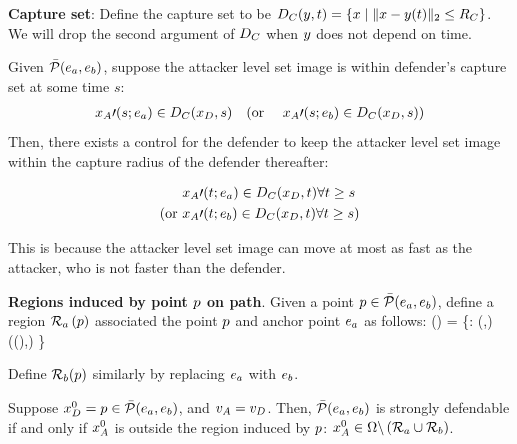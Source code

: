 \begin{defn} %
\textbf{Capture set}: Define the capture set to be $D_C(y,t)=\{x \mid \|x-y(t)\|_2\leq R_C\}$. We will drop the second argument of $D_C$ when $y$ does not depend on time.
\end{defn}

\begin{rem}
Given $\bar{\mathcal{P}}(e_a,e_b)$, suppose the attacker level set image is within defender's capture set at some time $s$: 
\begin{equation*}
\begin{aligned}
&x_A\prime(s;e_a) \in D_C(x_D, s) \quad \text{(or } & x_A\prime(s;e_b) \in D_C(x_D, s) \text{)}
\end{aligned}
\end{equation*}
Then, there exists a control for the defender to keep the attacker level set image within the capture radius of the defender thereafter: 

\begin{equation*}
\begin{aligned}
&x_A\prime(t;e_a) \in D_C(x_D, t) \forall t\geq s \\
\text{(or } & x_A\prime(t;e_b) \in D_C(x_D, t) \forall t\geq s\text{)}
\end{aligned}
\end{equation*}

This is because the attacker level set image can move at most as fast as the attacker, who is not faster than the defender.
\end{rem}

\begin{defn} %
\label{def:d_win_region}
\textbf{Regions induced by point $p$ on path}. Given a point $p\in\bar{\mathcal{P}}(e_a,e_b)$, define a region $\mathcal{R}_a\left(p\right)$ associated the point $p$ and anchor point $e_a$ as follows:
\bq
\rpa\left(\ppath\right) = \left\{\x: \dist(\x,\apa) \leq \dist(\Dc(\ppath),\apa) \right\}
\eq

Define $\mathcal{R}_b(p)$ similarly by replacing $e_a$ with $e_b$.
\end{defn}

\begin{lem}
\label{lem:d_winning_region}
Suppose $x_D^0 = p \in \bar{\mathcal{P}}(e_a,e_b)$, and $v_A=v_D$. Then, $\bar{\mathcal{P}}(e_a,e_b)$ is strongly defendable if and only if $x_A^0$ is outside the region induced by $p$: $x_A^0\in\Omega\backslash\left(\mathcal{R}_a \cup \mathcal{R}_b\right)$.
\end{lem}

